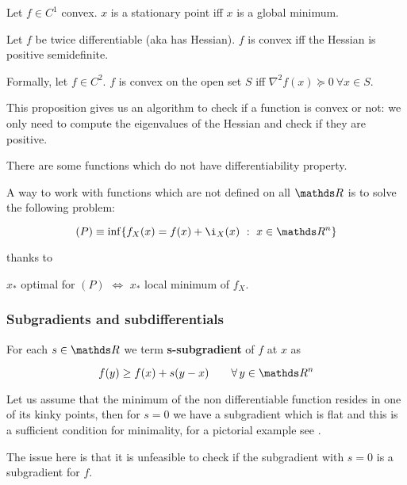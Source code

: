 \documentclass[ComputationalMathematics.tex]{subfiles}
\begin{document}
\begin{theorem}
Let $f \in C^1$ convex. $x$ is a stationary point iff $x$ is a global minimum.
\end{theorem}

\begin{proposition}
  Let $f$ be twice differentiable (aka has Hessian). $f$ is convex iff the Hessian is positive semidefinite.

  Formally, let $f \in C^2$. $f$ is convex on the open set $S$ iff $\nabla^2 f(x) \succeq 0~\forall x \in S$.
\end{proposition}

This proposition gives us an algorithm to check if a function is convex or not: we only need to compute the eigenvalues of the Hessian and check if they are positive.

There are some functions which do not have differentiability property.

A way to work with functions which are not defined on all $\R$ is to solve the following problem:

\[
  (P) \equiv \inf \{f_X(x) = f(x) + \i_X(x)~:~x \in \R^n\}
\]

thanks to

\begin{theorem}
$x_*$ optimal for $(P)$ $\iff$ $x_*$ local minimum of $f_X$.
\end{theorem}

\subsubsection{Subgradients and subdifferentials}

\begin{definition}[Subgradient]
  For each $s \in \R$ we term \textbf{s-subgradient} of $f$ at $x$ as
  
\[
  f(y) \geq f(x) + s (y - x) \qquad \forall \, y \in \R^n
\]
\end{definition}

Let us assume that the minimum of the non differentiable function resides in one of its kinky points, then for $s=0$ we have a subgradient which is flat and this is a sufficient condition for minimality, for a pictorial example see .


The issue here is that it is unfeasible to check if the subgradient with $s=0$ is a subgradient for $f$.
\end{document}
